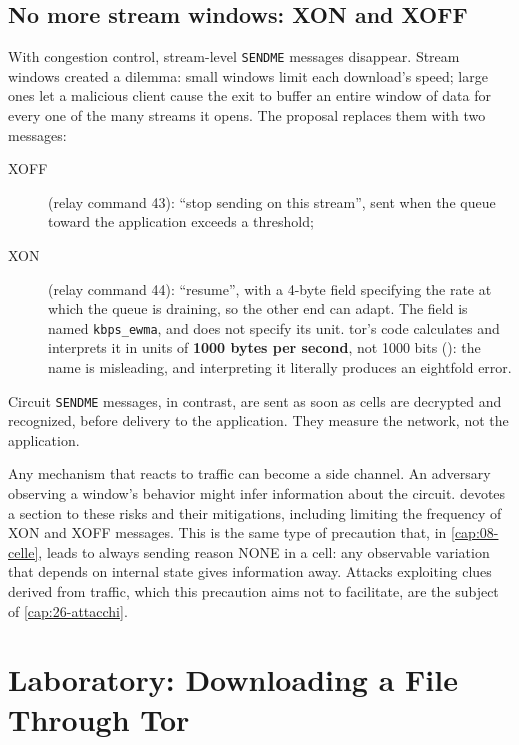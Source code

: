 \subsection{No more stream windows: XON and XOFF}

With congestion control, stream-level \texttt{SENDME} messages disappear. Stream windows created a dilemma: small windows limit each download's speed; large ones let a malicious client cause the exit to buffer an entire window of data for every one of the many streams it opens. The proposal replaces them with two messages:
\begin{description}
  \item[XOFF] (relay command 43): \enquote{stop sending on this stream}, sent when the queue toward the application exceeds a threshold;
  \item[XON] (relay command 44): \enquote{resume}, with a 4-byte field specifying the rate at which the queue is draining, so the other end can adapt. The field is named \texttt{kbps\_ewma}, and  does not specify its unit. tor's code calculates and interprets it in units of \textbf{1000 bytes per second}, not 1000 bits (): the name is misleading, and interpreting it literally produces an eightfold error.
\end{description}
Circuit \texttt{SENDME} messages, in contrast, are sent as soon as cells are decrypted and recognized, before delivery to the application. They measure the network, not the application.

\begin{attenzione}
Any mechanism that reacts to traffic can become a side channel. An adversary observing a window's behavior might infer information about the circuit.  devotes a section to these risks and their mitigations, including limiting the frequency of XON and XOFF messages. This is the same type of precaution that, in \cref{cap:08-celle}, leads to always sending reason NONE in a  cell: any observable variation that depends on internal state gives information away. Attacks exploiting clues derived from traffic, which this precaution aims not to facilitate, are the subject of \cref{cap:26-attacchi}.
\end{attenzione}

\section{Laboratory: Downloading a File Through Tor}\label{sec:lab-stream}

